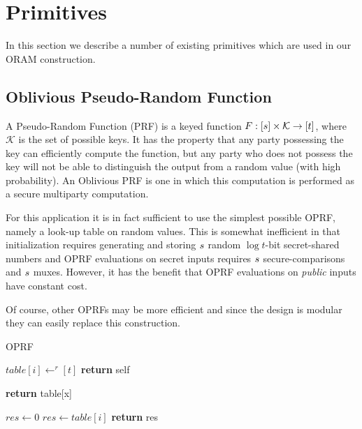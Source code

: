 
\section{Primitives}

In this section we describe a number of existing primitives which are
used in our ORAM construction.

\subsection{Oblivious Pseudo-Random Function}

A Pseudo-Random Function (PRF) is a keyed function
$F: [s] \times \mathcal{K} \rightarrow [t]$, 
where $\mathcal{K}$ is the set of possible keys.
It has the property that
any party possessing the key can efficiently compute the function,
but any party who does not possess the key
will not be able to distinguish the output from a random value
(with high probability).
An Oblivious PRF is one in which this computation is performed
as a secure multiparty computation.

For this application it is in fact sufficient to use the simplest possible
OPRF, namely a look-up table on random values.
This is somewhat inefficient in that 
initialization requires generating and storing 
$s$ random $\log{t}$-bit secret-shared numbers
and OPRF evaluations on secret inputs requires 
$s$ secure-comparisons and $s$ muxes. 
However, it has the benefit that OPRF evaluations on 
\emph{public} inputs have constant cost.

Of course, other OPRFs may be more efficient and since the design
is modular they can easily replace this construction.

\begin{algorithm}
\caption{OPRF}
\label{alg:oprf}
\begin{algorithmic}[1]

    \State $table[i] \gets^r [t]$
\EndFor
\State \textbf{return} self
\EndProcedure

\State

 
\State \textbf{return} table[x]
\EndProcedure

\State

\State $res \gets 0$
    \State $res \gets table[i]$
    \EndOblivIf
\EndFor
\State \textbf{return} res
\EndProcedure

\end{algorithmic}
\end{algorithm}



